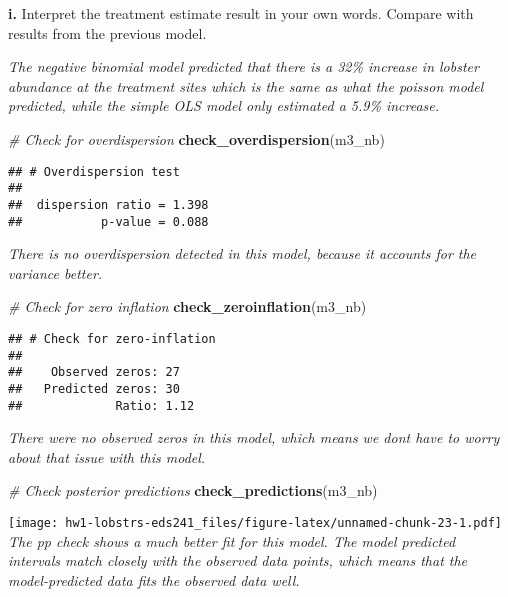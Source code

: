 \documentclass[
]{article}
\newenvironment{Shaded}{\begin{snugshade}}{\end{snugshade}}
\newcommand{\CommentTok}[1]{\textcolor[rgb]{0.56,0.35,0.01}{\textit{#1}}}
\newcommand{\FunctionTok}[1]{\textcolor[rgb]{0.13,0.29,0.53}{\textbf{#1}}}
\newcommand{\NormalTok}[1]{#1}
\begin{document}
\textbf{i.} Interpret the treatment estimate result in your own words.
Compare with results from the previous model.

\emph{The negative binomial model predicted that there is a 32\%
increase in lobster abundance at the treatment sites which is the same
as what the poisson model predicted, while the simple OLS model only
estimated a 5.9\% increase.}

\begin{Shaded}
\begin{Highlighting}[]
\CommentTok{\# Check for overdispersion}
\FunctionTok{check\_overdispersion}\NormalTok{(m3\_nb)}
\end{Highlighting}
\end{Shaded}

\begin{verbatim}
## # Overdispersion test
## 
##  dispersion ratio = 1.398
##           p-value = 0.088
\end{verbatim}

\emph{There is no overdispersion detected in this model, because it
accounts for the variance better.}

\begin{Shaded}
\begin{Highlighting}[]
\CommentTok{\# Check for zero inflation}
\FunctionTok{check\_zeroinflation}\NormalTok{(m3\_nb)}
\end{Highlighting}
\end{Shaded}

\begin{verbatim}
## # Check for zero-inflation
## 
##    Observed zeros: 27
##   Predicted zeros: 30
##             Ratio: 1.12
\end{verbatim}

\emph{There were no observed zeros in this model, which means we dont
have to worry about that issue with this model.}

\begin{Shaded}
\begin{Highlighting}[]
\CommentTok{\# Check posterior predictions}
\FunctionTok{check\_predictions}\NormalTok{(m3\_nb)}
\end{Highlighting}
\end{Shaded}

\texttt{[image: hw1-lobstrs-eds241\_files/figure-latex/unnamed-chunk-23-1.pdf]}
\emph{The pp check shows a much better fit for this model. The model
predicted intervals match closely with the observed data points, which
means that the model-predicted data fits the observed data well.}
\end{document}
